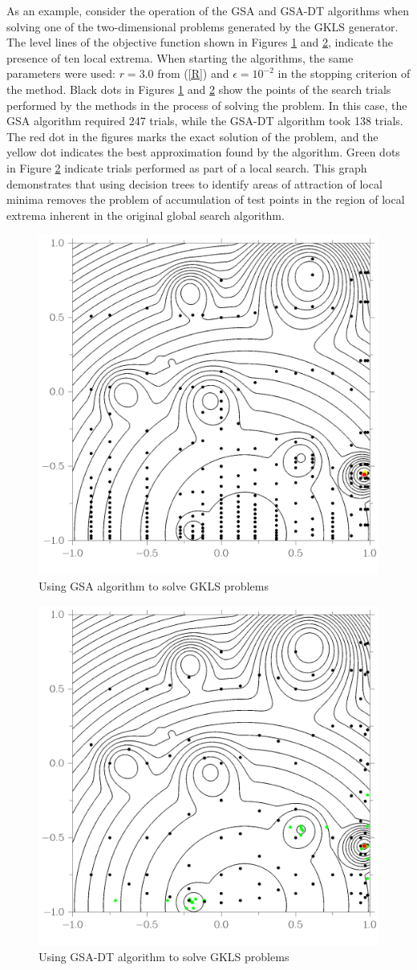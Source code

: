 \documentclass[entropy,article,submit,moreauthors,pdftex]{Definitions/mdpi}
\begin{document}
As an example, consider the operation of the GSA and GSA-DT algorithms when solving one of the two-dimensional problems generated by the GKLS generator. 
The level lines of the objective function shown in Figures \ref{fig3} and \ref{fig4}, indicate the presence of ten local extrema. 
When starting the algorithms, the same parameters were used:  $r=3.0$ from (\ref{R}) and $\epsilon = 10^{-2}$ in the stopping criterion of the method. 
Black dots in Figures \ref{fig3} and \ref{fig4} show the points of the search trials performed by the methods in the process of solving the problem. In this case, the GSA algorithm required 247 trials, while the GSA-DT algorithm took 138 trials.
The red dot in the figures marks the exact solution of the problem, and the yellow dot indicates the best approximation found by the algorithm. 
Green dots in Figure \ref{fig4} indicate trials performed as part of a local search. 
This graph demonstrates that using decision trees to identify areas of attraction of local minima removes the problem of accumulation of test points in the region of local extrema inherent in the original global search algorithm.


\begin{figure}[H]
\includegraphics[width=0.6\linewidth]{GKLSAdaptiv6_30line.png}
\caption{Using GSA algorithm to solve GKLS problems}
\label{fig3}
\end{figure}   

\begin{figure}[H]
\includegraphics[width=0.6\linewidth]{GKLSTree6_30line.png}
\caption{Using GSA-DT algorithm to solve GKLS problems}
\label{fig4}
\end{figure}   
\end{document}
